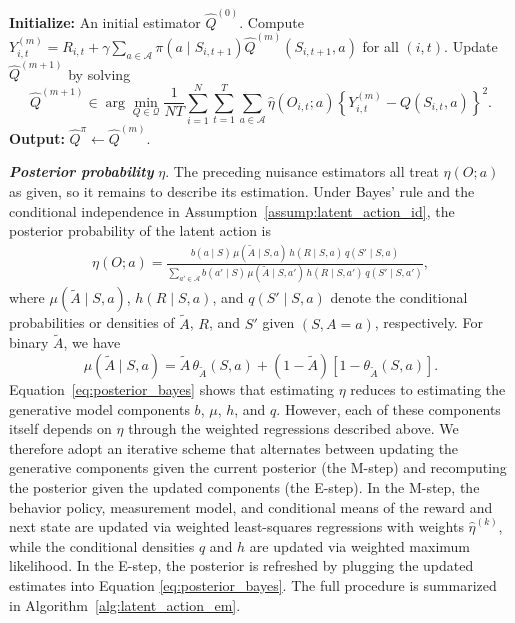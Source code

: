\documentclass[12pt]{article}
\newcommand{\0}{\boldsymbol{0}}
\begin{document}
\begin{algorithm}[H]
\caption{Weighted FQE}
\label{alg:fqe}
\begin{algorithmic}[1]
\State \textbf{Initialize:} An initial estimator $\widehat Q^{(0)}$.
    \State Compute
    $
    Y_{i,t}^{(m)}
    =
    R_{i,t}
    +
    \gamma
    \sum_{a\in\mathcal A}
    \pi(a\mid S_{i,t+1})
    \widehat Q^{(m)}(S_{i,t+1},a)
    $
    for all $(i,t)$.
    \State Update $\widehat Q^{(m+1)}$ by solving
    \Statex
    \[
    \widehat Q^{(m+1)}
    \in
    \arg\min_{Q\in\mathcal Q}
    \frac{1}{NT}
    \sum_{i=1}^N\sum_{t=1}^T
    \sum_{a\in\mathcal A}
    \widehat \eta(O_{i,t};a)
    \left\{
    Y_{i,t}^{(m)} - Q(S_{i,t},a)
    \right\}^2 .
    \]
\EndFor
\State \textbf{Output:} $\widehat Q^\pi \gets \widehat Q^{(m)}$.
\end{algorithmic}
\end{algorithm}


\textbf{\textit{Posterior probability}} $\eta$.
The preceding nuisance estimators all treat $\eta(O;a)$ as given, so it remains to describe its estimation. Under Bayes' rule and the conditional independence  in Assumption~\ref{assump:latent_action_id}, the posterior probability of the latent action is
\begin{align}
\eta(O;a)
=\frac{
b(a\mid S)\,
\mu(\widetilde A\mid S,a)\,
h(R\mid S,a)\,
q(S'\mid S,a)
}{
\sum_{a'\in\mathcal A}
b(a'\mid S)\,
\mu(\widetilde A\mid S,a')\,
h(R\mid S,a')\,
q(S'\mid S,a')
},
\label{eq:posterior_bayes}
\end{align}
where $\mu(\widetilde A\mid S,a)$, $h(R\mid S,a)$, and $q(S'\mid S,a)$ denote the conditional probabilities or densities of $\widetilde A$, $R$, and $S'$ given $(S,A=a)$, respectively. For binary $\widetilde A$, we have
\[
\mu(\widetilde A\mid S,a)
=
\widetilde A\,\theta_{\widetilde A}(S,a)
+
(1-\widetilde A)\left[1-\theta_{\widetilde A}(S,a)\right].
\]
Equation~\eqref{eq:posterior_bayes} shows that estimating $\eta$ reduces to estimating the generative model components $b$, $\mu$, $h$, and $q$. However, each of these components itself depends on $\eta$ through the weighted regressions described above. We therefore adopt an iterative scheme that alternates between updating the generative components given the current posterior (the M-step) and recomputing the posterior given the updated components (the E-step). In the M-step, the behavior policy, measurement model, and conditional means of the reward and next state are updated via weighted least-squares regressions with weights $\widehat\eta^{(k)}$, while the conditional densities $q$ and $h$ are updated via weighted maximum likelihood. In the E-step, the posterior is refreshed by plugging the updated estimates into Equation \eqref{eq:posterior_bayes}. The full procedure is summarized in Algorithm~\ref{alg:latent_action_em}.
\end{document}

